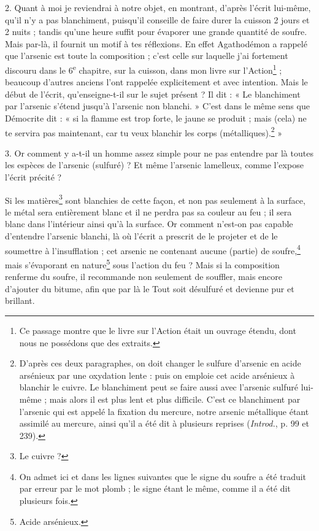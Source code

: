 \documentclass[landscape, a4paper, 11pt, oneside, polutonikogreek, french]{article}
\begin{document}
2. Quant à moi je reviendrai à notre objet, en montrant, d'après l'écrit lui-même, qu'il n'y a pas blanchiment, puisqu'il conseille de faire durer la cuisson 2 jours et 2 nuits ; tandis qu'une heure suffit pour évaporer une grande quantité de soufre. Mais par-là, il fournit un motif à tes réflexions. En effet Agathodémon a rappelé que l'arsenic est toute la composition ; c'est celle sur laquelle j'ai fortement discouru dans le 6\textsuperscript{e} chapitre, sur la cuisson, dans mon livre sur l'Action\footnote{Ce passage montre que le livre sur l'Action était un ouvrage étendu, dont nous ne possédons que des extraits.} ; beaucoup d'autres anciens l'ont rappelée explicitement et avec intention. Mais le début de l'écrit, qu'enseigne-t-il sur le sujet présent ? Il dit : « Le blanchiment par l'arsenic s'étend jusqu'à l'arsenic non blanchi. » C'est dans le même sens que Démocrite dit : « si la flamme est trop forte, le jaune se produit ; mais (cela) ne te servira pas maintenant, car tu veux blanchir les corps (métalliques).\footnote{D'après ces deux paragraphes, on doit changer le sulfure d'arsenic en acide arsénieux par une oxydation lente : puis on emploie cet acide arsénieux à blanchir le cuivre. Le blanchiment peut se faire aussi avec l'arsenic sulfuré lui-même ; mais alors il est plus lent et plus difficile. C'est ce blanchiment par l'arsenic qui est appelé la fixation du mercure, notre arsenic métallique étant assimilé au mercure, ainsi qu'il a été dit à plusieurs reprises (\emph{Introd.}, p. 99 et 239).} »

3. Or comment y a-t-il un homme assez simple pour ne pas entendre par là toutes les espèces de l'arsenic (sulfuré) ? Et même l'arsenic lamelleux, comme l'expose l'écrit précité ?

Si les matières\footnote{Le cuivre ?} sont blanchies de cette façon, et non pas seulement à la surface, le métal sera entièrement blanc et il ne perdra pas sa couleur au feu ; il sera blanc dans l'intérieur ainsi qu'à la surface. Or comment n'est-on pas capable d'entendre l'arsenic blanchi, là où l'écrit a prescrit de le projeter et de le soumettre à l'insufflation ; cet arsenic ne contenant aucune (partie) de soufre,\footnote{On admet ici et dans les lignes suivantes que le signe du soufre a été traduit par erreur par le mot plomb ; le signe étant le même, comme il a été dit plusieurs fois.} mais s'évaporant en nature\footnote{Acide arsénieux.} sous l'action du feu ? Mais si la composition renferme du soufre, il recommande non seulement de souffler, mais encore d'ajouter du bitume, afin que par là le Tout soit désulfuré et devienne pur et brillant.
\end{document}
